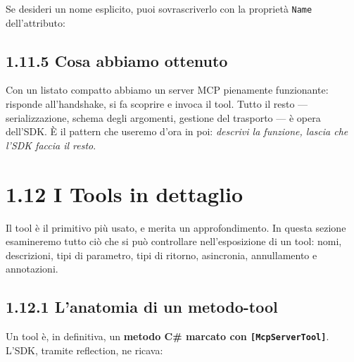 \documentclass[
  italian,
  10pt,
]{book}
\newenvironment{Shaded}{\begin{snugshade}}{\end{snugshade}}
\newcommand{\DataTypeTok}[1]{\textcolor[rgb]{0.13,0.29,0.53}{#1}}
\newcommand{\FunctionTok}[1]{\textcolor[rgb]{0.13,0.29,0.53}{\textbf{#1}}}
\newcommand{\KeywordTok}[1]{\textcolor[rgb]{0.13,0.29,0.53}{\textbf{#1}}}
\newcommand{\NormalTok}[1]{#1}
\newcommand{\OperatorTok}[1]{\textcolor[rgb]{0.81,0.36,0.00}{\textbf{#1}}}
\newcommand{\StringTok}[1]{\textcolor[rgb]{0.31,0.60,0.02}{#1}}
\begin{document}
Se desideri un nome esplicito, puoi sovrascriverlo con la proprietà
\texttt{Name} dell'attributo:

\begin{Shaded}
\end{Shaded}

\subsection{1.11.5 Cosa abbiamo ottenuto}\label{cosa-abbiamo-ottenuto}

Con un listato compatto abbiamo un server MCP pienamente funzionante:
risponde all'handshake, si fa scoprire e invoca il tool. Tutto il resto
--- serializzazione, schema degli argomenti, gestione del trasporto ---
è opera dell'SDK. È il pattern che useremo d'ora in poi: \emph{descrivi
la funzione, lascia che l'SDK faccia il resto}.

\section{1.12 I Tools in dettaglio}\label{i-tools-in-dettaglio}

Il tool è il primitivo più usato, e merita un approfondimento. In questa
sezione esamineremo tutto ciò che si può controllare nell'esposizione di
un tool: nomi, descrizioni, tipi di parametro, tipi di ritorno,
asincronia, annullamento e annotazioni.

\subsection{1.12.1 L'anatomia di un
metodo-tool}\label{lanatomia-di-un-metodo-tool}

Un tool è, in definitiva, un \textbf{metodo C\# marcato con
\texttt{{[}McpServerTool{]}}}. L'SDK, tramite reflection, ne ricava:
\end{document}
